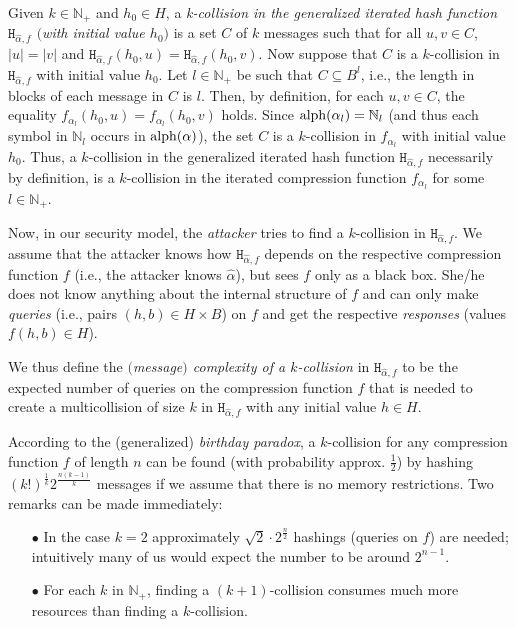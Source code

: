 \documentclass[submission,copyright,creativecommons]{eptcs}
\newcommand{\N}{\mathbb N}
\newcommand{\alp}{{\rm alph}}
\newcommand{\h}{\mathtt H}
\newcounter{dep}
\begin{document}
Given $k\in\N_+$ and $h_0\in H$, a \textit{k-collision in the generalized iterated hash function $\h_{\hat{\alpha},f}$ $($with initial value $h_0$$)$} is a set
$C$ of $k$ messages such that for all $u,v\in C$,
$|u|=|v|$ and $\h_{\hat{\alpha},f}(h_0,u)=\h_{\hat{\alpha},f}(h_0,v)$. Now suppose
that $C$ is a $k$-collision in $\h_{\hat{\alpha},f}$ with
initial value $h_0$. Let $l\in\N_+$ be such that
$C\subseteq B^l$, i.e., the length in blocks of each message in
$C$ is $l$. Then, by definition, for each $u,v\in C$, the equality
$f_{\alpha_l}(h_0,u)=f_{\alpha_l}(h_0,v)$ holds. Since
$\alp(\alpha_l)=\N_l$ (and thus each symbol in $\N_l$ occurs in $\alp(\alpha)$), the set $C$ is a $k$-collision
in $f_{\alpha_l}$ with initial value $h_0$. Thus, a $k$-collision in the generalized iterated hash function $\h_{\hat{\alpha},f}$ necessarily by definition, is a $k$-collision in the iterated compression function $f_{\alpha_l}$ for some $l\in\N_+$.

Now, in our security model, the \textit{attacker} tries to find a $k$-collision in $\h_{\hat{\alpha},f}$. We assume that the attacker knows how $\h_{\hat{\alpha},f}$ depends on the respective compression function $f$ (i.e., the attacker knows $\hat\alpha$), but sees $f$ only
as a black box. She/he does not know anything about the internal
structure of $f$ and can only make \textit{queries} (i.e., pairs $(h,b)\in H\times B$) on
$f$ and get the respective \textit{responses} (values $f(h,b)\in H$).

We thus define the \textit{$($message$)$ complexity of a $k$-collision} in $\h_{\hat{\alpha},f}$ to be the expected number of queries on the compression function $f$ that is needed to create a multicollision of size $k$ in $\h_{\hat{\alpha},f}$ with any initial value $h\in H$.

According to the (generalized) \textit{birthday paradox}, a $k$-collision for any compression function $f$ of length $n$ can be found 
(with probability approx. $\frac{1}{2}$) by hashing  $(k!)^{\frac{1}{k}}2^{\frac{n(k-1)}{k}}$ messages \cite{STKT} if 
we assume that there is no memory restrictions. Two remarks can be made immediately: 

\begin{itemize}
\item[$\bullet$] In the case $k=2$ approximately $\sqrt{2}\cdot 2^{\frac{n}{2}}$ hashings (queries on $f$) are needed; intuitively many of us 
would expect the number to be around $2^{n-1}$.
\item[$\bullet$] For each $k$ in $\N_+$, finding a $(k+1)$-collision consumes much more resources than finding a 
$k$-collision.
\end{itemize}
\end{document}

